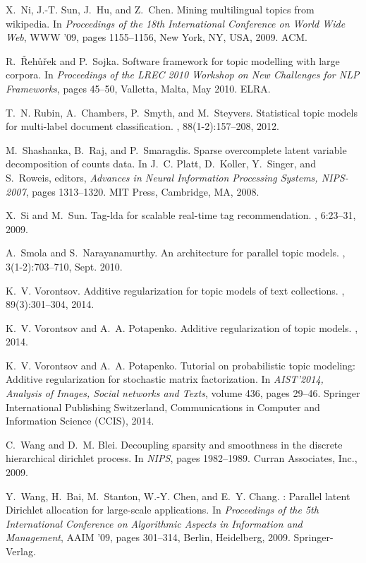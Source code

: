 \documentclass{sig-alternate}
\begin{document}
\begin{thebibliography}{10}
X.~Ni, J.-T. Sun, J.~Hu, and Z.~Chen.
\newblock Mining multilingual topics from wikipedia.
\newblock In {\em Proceedings of the 18th International Conference on World
  Wide Web}, WWW '09, pages 1155--1156, New York, NY, USA, 2009. ACM.

R.~\v{R}eh\r{u}\v{r}ek and P.~Sojka.
\newblock Software framework for topic modelling with large corpora.
\newblock In {\em Proceedings of the {LREC} 2010 Workshop on New Challenges for
  {NLP} Frameworks}, pages 45--50, Valletta, Malta, May 2010. {ELRA}.

T.~N. Rubin, A.~Chambers, P.~Smyth, and M.~Steyvers.
\newblock Statistical topic models for multi-label document classification.
, 88(1-2):157--208, 2012.

M.~Shashanka, B.~Raj, and P.~Smaragdis.
\newblock Sparse overcomplete latent variable decomposition of counts data.
\newblock In J.~C. Platt, D.~Koller, Y.~Singer, and S.~Roweis, editors, {\em
  Advances in Neural Information Processing Systems, NIPS-2007}, pages
  1313--1320. MIT Press, Cambridge, MA, 2008.

X.~Si and M.~Sun.
\newblock Tag-lda for scalable real-time tag recommendation.
, 6:23--31,
  2009.

A.~Smola and S.~Narayanamurthy.
\newblock An architecture for parallel topic models.
, 3(1-2):703--710, Sept. 2010.

K.~V. Vorontsov.
\newblock Additive regularization for topic models of text collections.
, 89(3):301--304, 2014.

K.~V. Vorontsov and A.~A. Potapenko.
\newblock Additive regularization of topic models.
, 2014.

K.~V. Vorontsov and A.~A. Potapenko.
\newblock Tutorial on probabilistic topic modeling: Additive regularization for
  stochastic matrix factorization.
\newblock In {\em AIST'2014, Analysis of Images, Social networks and Texts},
  volume 436, pages 29--46. Springer International Publishing Switzerland,
  Communications in Computer and Information Science (CCIS), 2014.

C.~Wang and D.~M. Blei.
\newblock Decoupling sparsity and smoothness in the discrete hierarchical
  dirichlet process.
\newblock In {\em NIPS}, pages 1982--1989. Curran Associates, Inc., 2009.

Y.~Wang, H.~Bai, M.~Stanton, W.-Y. Chen, and E.~Y. Chang.
: Parallel latent {D}irichlet allocation for large-scale
  applications.
\newblock In {\em Proceedings of the 5th International Conference on
  Algorithmic Aspects in Information and Management}, AAIM '09, pages 301--314,
  Berlin, Heidelberg, 2009. Springer-Verlag.

\end{thebibliography}
\end{document}
